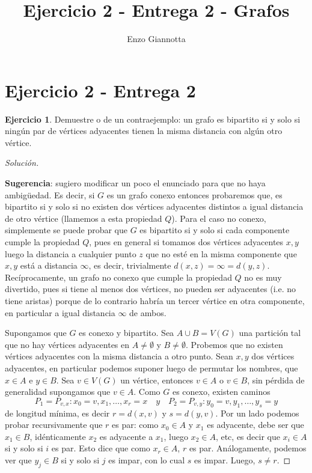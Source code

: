 \documentclass[12pt]{report}
\title{Ejercicio 2 - Entrega 2 - Grafos}
\author{Enzo Giannotta}
\theoremstyle{plain}
\theoremstyle{definition}
\newtheorem{exercise}[theorem]{Ejercicio}
\newenvironment{solution}{\begin{proof}[Solución]}{\end{proof}}
\begin{document}
\maketitle

\section{Ejercicio 2 - Entrega 2}

\begin{exercise}
Demuestre o de un contraejemplo: un grafo es bipartito si y solo si ningún par de vértices adyacentes tienen la misma distancia con algún otro vértice.
\end{exercise}
\begin{solution}
\begin{shaded}
\textbf{Sugerencia}: sugiero modificar un poco el enunciado para que no haya ambigüedad. Es decir, si $G$ es un grafo conexo entonces probaremos que, es bipartito si y solo si no existen dos vértices adyacentes distintos a igual distancia de otro vértice (llamemos a esta propiedad $Q$). Para el caso no conexo, simplemente se puede probar que $G$ es bipartito si y solo si cada componente cumple la propiedad $Q$, pues en general si tomamos dos vértices adyacentes $x,y$ luego la distancia a cualquier punto $z$ que no esté en la misma componente que $x,y$ está a distancia $\infty$, es decir, trivialmente $d(x,z) = \infty = d(y,z)$. Recíprocamente, un grafo no conexo que cumple la propiedad $Q$ no es muy divertido, pues si tiene al menos dos vértices, no pueden ser adyacentes (i.e. no tiene aristas) porque de lo contrario habría un tercer vértice en otra componente, en particular a igual distancia $\infty$ de ambos.
\end{shaded}

Supongamos que $G$ es conexo y bipartito. Sea $A\cup B = V(G)$ una partición tal que no hay vértices adyacentes en $A\neq \emptyset$ y $B \neq \emptyset$. Probemos que no existen vértices adyacentes con la misma distancia a otro punto. Sean $x,y$ dos vértices adyacentes, en particular podemos suponer luego de permutar los nombres, que $x \in A$ e $y \in B$. Sea $v \in V(G)$ un vértice, entonces $v \in A$ o $v \in B$, sin pérdida de generalidad supongamos que $v \in A$. Como $G$ es conexo, existen caminos
$$
P_1 = P_{v,x} : x_0=v, x_1, \ldots , x_r=x \quad y \quad P_2 = P_{v,y} : y_0 = v , y_1, \ldots, y_s = y
$$
de longitud mínima, es decir $r = d (x,v)$ y $s = d (y,v)$. Por un lado podemos probar recursivamente que $r$ es par: como $x_0 \in A$ y $x_1$ es adyacente, debe ser que $x_1 \in B$, idénticamente $x_2$ es adyacente a $x_1$, luego $x_2 \in A$, etc, es decir que $x_i \in A$ si y solo si $i$ es par. Esto dice que como $x_r \in A$, $r$ es par. Análogamente, podemos ver que $y_j \in B$ si y solo si $j$ es impar, con lo cual $s$ es impar. Luego, $s \neq r$.


\end{solution}
\end{document}
